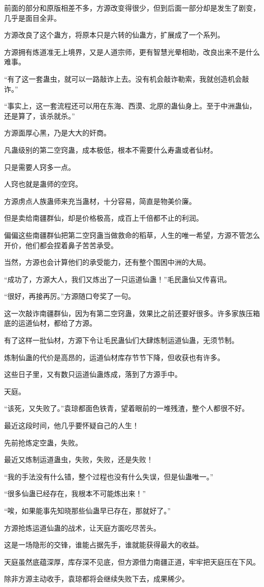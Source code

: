 \begin{this_body}
前面的部分和原版相差不多，方源改变得很少，但到后面一部分却是发生了剧变，几乎是面目全非。

方源改良了这个蛊方，将原本只是六转的仙蛊方，扩展成了一个系列。

方源拥有炼道准无上境界，又是人道宗师，更有智慧光晕相助，改良出来不是什么难事。

“有了这一套蛊虫，就可以一路敲诈上去。没有机会敲诈勒索，我就创造机会敲诈。”

“事实上，这一套流程还可以用在东海、西漠、北原的蛊仙身上。至于中洲蛊仙，还是算了，该杀就杀。”

方源面厚心黑，乃是大大的奸商。

凡蛊级别的第二空窍蛊，成本极低，根本不需要什么寿蛊或者仙材。

只是需要人窍多一点。

人窍也就是蛊师的空窍。

方源虏点人族蛊师来充当蛊材，十分容易，简直是物美价廉。

但是卖给南疆群仙，却是价格极高，成百上千倍都不止的利润。

偏偏这些南疆群仙把第二空窍蛊当做救命的稻草，人生的唯一希望，方源不管怎么开价，他们都会捏着鼻子苦苦承受。

当然，方源也会计算他们的承受能力，还有整个围困中洲的大局。

“成功了，方源大人，我们又炼出了一只运道仙蛊！”毛民蛊仙又传喜讯。

“很好，再接再厉。”方源随口夸奖了一句。

这一次敲诈南疆群仙，因为有第二空窍蛊，效果比之前还要好很多。许多家族压箱底的运道仙材，都给了方源。

有了这样一批仙材，方源下令让毛民蛊仙们大肆炼制运道仙蛊，无须节制。

炼制仙蛊的代价是高昂的，运道仙材库存节节下降，但收获也有许多。

这些日子里，又有数只运道仙蛊炼成，落到了方源手中。

天庭。

“该死，又失败了。”袁琼都面色铁青，望着眼前的一堆残渣，整个人都很不好。

最近这段时间，他几乎要怀疑自己的人生！

先前抢炼定空蛊，失败。

最近又炼制运道蛊虫，失败，失败，还是失败！

“我的手法没有什么错，整个过程也没有什么失误，但是仙蛊唯一。”

“很多仙蛊已经存在，我根本不可能炼出来！”

“唉，如果能事先知晓那些仙蛊早已存在，那就好了。”

方源抢炼运道仙蛊的战术，让天庭方面吃尽苦头。

这是一场隐形的交锋，谁能占据先手，谁就能获得最大的收益。

天庭虽然底蕴深厚，库存深不见底，但方源借力南疆正道，牢牢把天庭压在下风。

除非方源主动收手，袁琼都将会继续失败下去，成果稀少。

\end{this_body}

